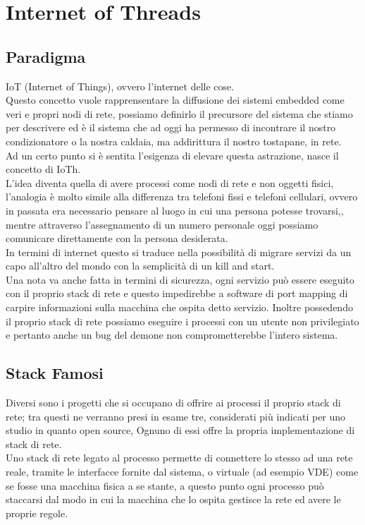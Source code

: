 \chapter{Internet of Threads}                %
\lhead[\fancyplain{}{\bfseries\thepage}]{\fancyplain{}{\bfseries\rightmark}}
\section{Paradigma}                 %
IoT (Internet of Things), ovvero l'internet delle cose.\\
Questo concetto vuole rapprensentare la diffusione dei sistemi embedded come veri e propri nodi di rete, possiamo definirlo il precursore del sistema che stiamo per descrivere ed \`e il sistema che ad oggi ha permesso di incontrare il nostro condizionatore o la nostra caldaia, ma addirittura il nostro tostapane, in rete.\\
Ad un certo punto si \`e sentita l'esigenza di elevare questa astrazione, nasce il concetto di IoTh.\\
L'idea diventa quella di avere processi come nodi di rete e non oggetti fisici, l'analogia \`e molto simile alla differenza tra telefoni fissi e telefoni cellulari, ovvero in passata era necessario pensare al luogo in cui una persona potesse trovarsi,, mentre attraverso l'assegnamento di un numero personale oggi possiamo comunicare direttamente con la persona desiderata\cite{K1,K2}.\\
In termini di internet questo si traduce nella possibilit\`a di migrare servizi da un capo all'altro del mondo con la semplicit\`a di un kill and start.\\
Una nota va anche fatta in termini di sicurezza, ogni servizio pu\`o essere eseguito con il proprio stack di rete e questo impedirebbe a software di port mapping di carpire informazioni sulla macchina che ospita detto servizio. Inoltre possedendo il proprio stack di rete possiamo eseguire i processi con un utente non privilegiato e pertanto anche un bug del demone non comprometterebbe l'intero sistema.

\section{Stack Famosi}
Diversi sono i progetti che si occupano di offrire ai processi il proprio stack di rete; tra questi ne verranno presi in esame tre, considerati pi\`u indicati per uno studio in quanto open source, Ognuno di essi offre la propria implementazione di stack di rete.\\
Uno stack di rete legato al processo permette di connettere lo stesso ad una rete reale, tramite le interfacce fornite dal sistema, o virtuale (ad esempio VDE) come se fosse una macchina fisica a se stante, a questo punto ogni processo pu\`o staccarsi dal modo in cui la macchina che lo ospita gestisce la rete ed avere le proprie regole.\\

